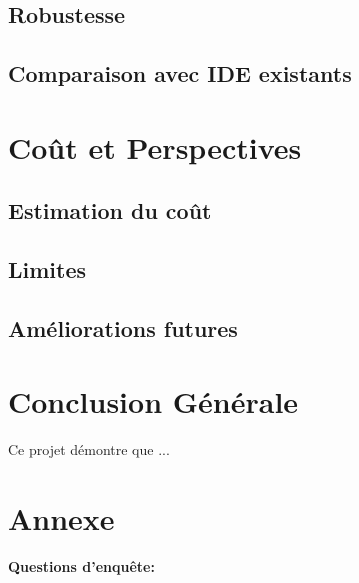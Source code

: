 \documentclass[a4paper,oneside,12pt]{book}
\renewcommand{\bibname}{%
	Bibliographie et webographie}
\renewcommand{\bibname}{%
		Bibliographie et webographie}}
\begin{document}
\section{Robustesse}
\section{Comparaison avec IDE existants}

\chapter{Coût et Perspectives}
\section{Estimation du coût}
\section{Limites}
\section{Améliorations futures}

\chapter{Conclusion Générale}

Ce projet démontre que ...



 

\newpage





           
\renewcommand{\bibname}{Références bibliographiques et webographiques}



%
%




\nocite{ref1}
\nocite{xamp}
\nocite{javascripte}

\appendix
\newpage
\pagestyle{fancyplain}

\chapter*{Annexe}
{\large\textbf{Questions d'enqu\^ete:}}\\
\end{document}
